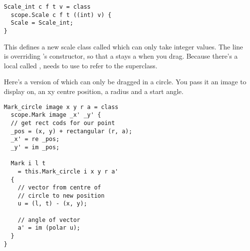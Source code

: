 \begin{verbatim}
Scale_int c f t v = class
  scope.Scale c f t ((int) v) {
  Scale = Scale_int;
}
\end{verbatim}

\noindent
This defines a new scale class called  which can only take
integer values. The  line is 
overriding 's constructor, so that a  stays a
 when you drag. Because there's a local called ,
 needs to use  to refer to the superclass.

Here's a version of  which can only be dragged in a circle. You pass
it an image to display on, an xy centre position, a radius and a start angle.

\begin{verbatim}
Mark_circle image x y r a = class 
  scope.Mark image _x' _y' {
  // get rect cods for our point
  _pos = (x, y) + rectangular (r, a);
  _x' = re _pos;
  _y' = im _pos;

  Mark i l t 
    = this.Mark_circle i x y r a'
  {
    // vector from centre of
    // circle to new position
    u = (l, t) - (x, y);

    // angle of vector
    a' = im (polar u);
  }
}
\end{verbatim}

